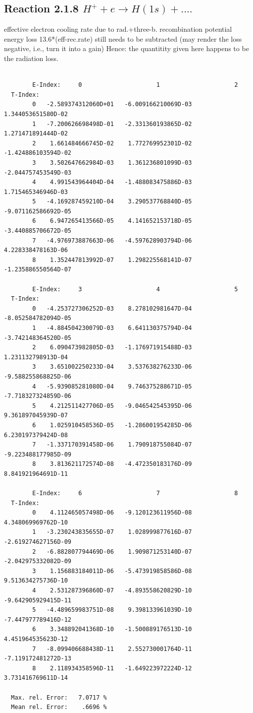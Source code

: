 \documentclass[12pt,dvips]{article}
\begin{document}
\subsection{
  Reaction 2.1.8  $H^+ + e  \rightarrow H(1s) + ....$
}

   effective electron cooling rate due to rad.+three-b. recombination
   potential energy loss 13.6*(eff-rec.rate) still needs to be
   subtracted (may render the loss negative, i.e., turn it into a gain)
   Hence: the quantitity given here happens to be the radiation loss.

\begin{small}\begin{verbatim}

        E-Index:     0                     1                     2
  T-Index:
        0   -2.589374312060D+01   -6.009166210069D-03    1.344053651580D-02
        1   -7.200626698498D-01   -2.331360193865D-02    1.271471891444D-02
        2    1.661484666745D-02    1.772769952301D-02   -1.424886103594D-02
        3    3.502647662984D-03    1.361236801099D-03   -2.044757453549D-03
        4    4.991543964404D-04   -1.488083475886D-03    1.715465346946D-03
        5   -4.169287459210D-04    3.290537768840D-05   -9.071162586692D-05
        6    6.947265413566D-05    4.141652153718D-05   -3.440885706672D-05
        7   -4.976973887663D-06   -4.597628903794D-06    4.228338478163D-06
        8    1.352447813992D-07    1.298225568141D-07   -1.235886550564D-07

        E-Index:     3                     4                     5
  T-Index:
        0   -4.253727306252D-03    8.278102981647D-04   -8.052584782094D-05
        1   -4.884504230079D-03    6.641130375794D-04   -3.742148364520D-05
        2    6.090473982805D-03   -1.176971915488D-03    1.231132798913D-04
        3    3.651002250233D-04    3.537638276233D-06   -9.588255868825D-06
        4   -5.939085281080D-04    9.746375288671D-05   -7.718327324859D-06
        5    4.212511427706D-05   -9.046542545395D-06    9.361897045939D-07
        6    1.025910458536D-05   -1.286001954285D-06    6.230197379424D-08
        7   -1.337170391458D-06    1.790918755084D-07   -9.223488177985D-09
        8    3.813621172574D-08   -4.472350183176D-09    8.841921964691D-11

        E-Index:     6                     7                     8
  T-Index:
        0    4.112465057498D-06   -9.120123611956D-08    4.348069969762D-10
        1   -3.230243835655D-07    1.028999877616D-07   -2.619274627156D-09
        2   -6.882807794469D-06    1.909871253140D-07   -2.042975332082D-09
        3    1.156883184011D-06   -5.473919858586D-08    9.513634275736D-10
        4    2.531287396860D-07   -4.893558620829D-10   -9.642905929415D-11
        5   -4.489659983751D-08    9.398133961039D-10   -7.447977789416D-12
        6    3.348892041368D-10   -1.500889176513D-10    4.451964535623D-12
        7   -8.099406688438D-11    2.552730001764D-11   -7.119172481272D-13
        8    2.118934358596D-11   -1.649223972224D-12    3.731416769611D-14

  Max. rel. Error:   7.0717 %
  Mean rel. Error:    .6696 %


\end{verbatim}\end{small}
\end{document}
